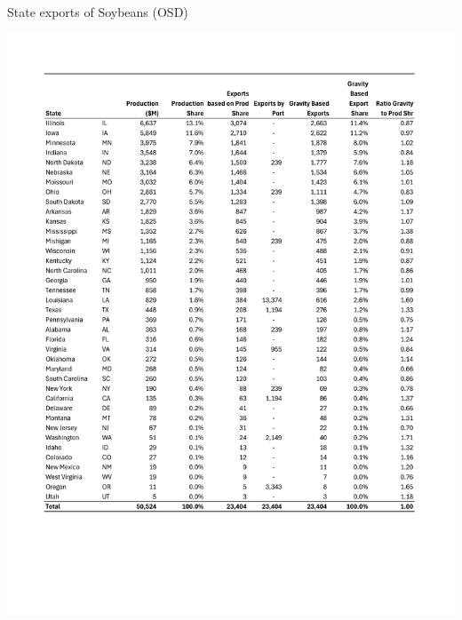 \documentclass{ejb}
\begin{document}
\begin{table}
\caption{State exports of Soybeans (OSD)}
\includegraphics[scale=0.7]{Soybeans.pdf}
\end{table}
\end{document}
